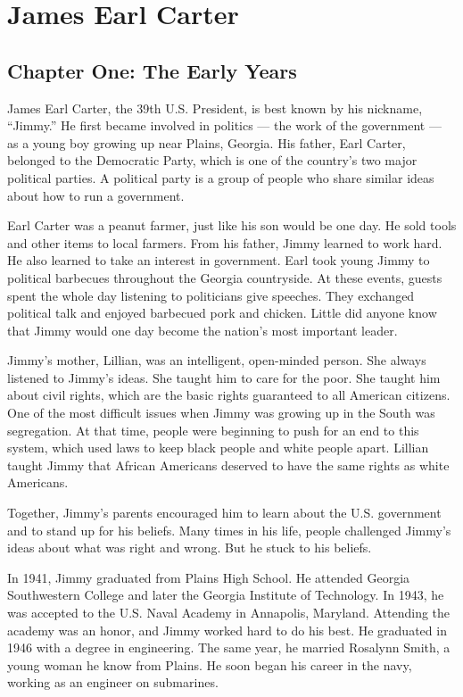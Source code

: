 \documentclass{article}
\begin{document}
\section*{James Earl Carter}

\subsection*{Chapter One: The Early Years}

James Earl Carter, the 39th U.S. President, is best known by his nickname, ``Jimmy.'' He first became involved in politics --- the work of the government --- as a young boy growing up near Plains, Georgia. His father, Earl Carter, belonged to the Democratic Party, which is one of the country's two major political parties. A political party is a group of people who share similar ideas about how to run a government.

Earl Carter was a peanut farmer, just like his son would be one day. He sold tools and other items to local farmers. From his father, Jimmy learned to work hard. He also learned to take an interest in government. Earl took young Jimmy to political barbecues throughout the Georgia countryside. At these events, guests spent the whole day listening to politicians give speeches. They exchanged political talk and enjoyed barbecued pork and chicken. Little did anyone know that Jimmy would one day become the nation's most important leader.

Jimmy's mother, Lillian, was an intelligent, open-minded person. She always listened to Jimmy's ideas. She taught him to care for the poor. She taught him about civil rights, which are the basic rights guaranteed to all American citizens. One of the most difficult issues when Jimmy was growing up in the South was segregation. At that time, people were beginning to push for an end to this system, which used laws to keep black people and white people apart. Lillian taught Jimmy that African Americans deserved to have the same rights as white Americans.

Together, Jimmy's parents encouraged him to learn about the U.S. government and to stand up for his beliefs. Many times in his life, people challenged Jimmy's ideas about what was right and wrong. But he stuck to his beliefs.

In 1941, Jimmy graduated from Plains High School. He attended Georgia Southwestern College and later the Georgia Institute of Technology. In 1943, he was accepted to the U.S. Naval Academy in Annapolis, Maryland. Attending the academy was an honor, and Jimmy worked hard to do his best. He graduated in 1946 with a degree in engineering. The same year, he married Rosalynn Smith, a young woman he know from Plains. He soon began his career in the navy, working as an engineer on submarines.
\end{document}
